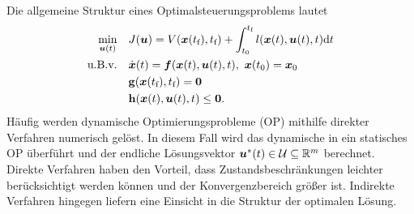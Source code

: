 %
%
%
%
%
%
%
%
%
%
%
%

Die allgemeine Struktur eines Optimalsteuerungsproblems lautet
%
\begin{equation*} \begin{aligned}
		\min\limits_{\boldsymbol{u}(t)} \ \ \ & J(\boldsymbol{u})=V(\boldsymbol{x}(t_\text{f}),t_\text{f}) + \int_{t_0}^{t_\text{f}}l(\boldsymbol{x}(t),\boldsymbol{u}(t),t)\text{d}t \\
		\text{u.B.v.} \ \ \ & \dot{\boldsymbol{x}}(t)=\boldsymbol{f}(\boldsymbol{x}(t),\boldsymbol{u}(t),t), \ \boldsymbol{x}(t_0)=\boldsymbol{x}_0\\ 
		& \mathbf{g}(\boldsymbol{x}(t_\text{f}),t_\text{f}) = \boldsymbol{0} \\
		& \mathbf{h}(\boldsymbol{x}(t),\boldsymbol{u}(t),t) \leq \boldsymbol{0}.
\end{aligned} \end{equation*}
%
Häufig werden dynamische Optimierungsprobleme (OP) mithilfe direkter Verfahren numerisch gelöst. 
In diesem Fall wird das dynamische in ein statisches OP überführt und der endliche Lösungsvektor ${\boldsymbol{u}}^*(t) \in \mathcal{U} \subseteq \mathbb{R}^m$ berechnet. 
Direkte Verfahren haben den Vorteil, dass Zustandsbeschränkungen leichter berücksichtigt werden können und der Konvergenzbereich größer ist. 
Indirekte Verfahren hingegen liefern eine Einsicht in die Struktur der optimalen Lösung.

